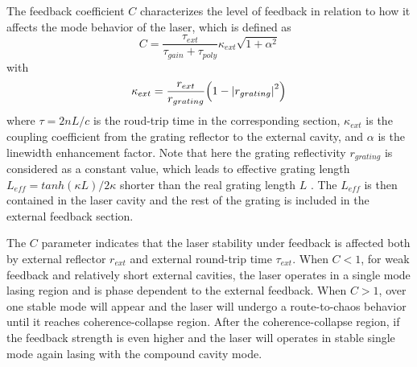 The feedback coefficient $C$ characterizes the level of feedback in relation to how it affects the mode behavior of the laser, which is defined as \cite{petermann2012laser}
\begin{equation}
    C=\frac{\tau_{ext}}{\tau_{gain}+\tau_{poly}}\kappa_{ext}\sqrt{1+\alpha^2}
\end{equation}
with
\begin{equation}
    \kappa_{ext}=\frac{r_{ext}}{r_{grating}}\qty(1-\abs{r_{grating}}^2)
\end{equation}
where $\tau=2nL/c$ is the roud-trip time in the corresponding section, $\kappa_{ext}$ is the coupling coefficient from the grating reflector to the external cavity, and $\alpha$ is the linewidth enhancement factor. Note that here the grating reflectivity $r_{grating}$ is considered as a constant value, which leads to effective grating length $L_{eff}=tanh(\kappa L)/2\kappa$ shorter than the real grating length $L$ \cite{kuznetsov1988theory}. The $L_{eff}$ is then contained in the laser cavity and the rest of the grating is included in the external feedback section.

The $C$ parameter indicates that the laser stability under feedback is affected both by external reflector $r_{ext}$ and external round-trip time $\tau_{ext}$. When $C<1$, for weak feedback and relatively short external cavities, the laser operates in a single mode lasing region and is phase dependent to the external feedback. When $C>1$, over one stable mode will appear and the laser will undergo a route-to-chaos behavior until it reaches coherence-collapse \cite{lenstra1985coherence} region. After the coherence-collapse region, if the feedback strength is even higher and the laser will operates in stable single mode again lasing with the compound cavity mode.


